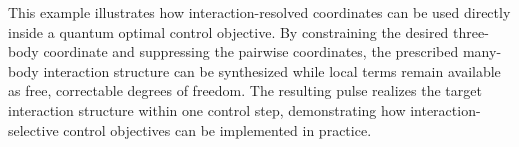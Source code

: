 \noindent
This example illustrates how interaction-resolved coordinates can be used directly inside a quantum optimal control objective. By constraining the desired three-body coordinate and suppressing the pairwise coordinates, the prescribed many-body interaction structure can be synthesized while local terms remain available as free, correctable degrees of freedom. The resulting pulse realizes the target interaction structure within one control step, demonstrating how interaction-selective control objectives can be implemented in practice.
